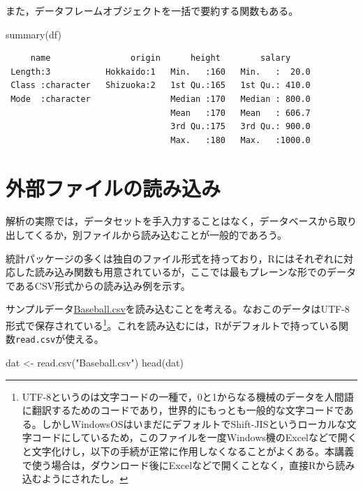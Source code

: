 \documentclass[
  a4paper,
]{ltjsbook}
\newenvironment{Shaded}{\begin{snugshade}}{\end{snugshade}}
\newcommand{\FunctionTok}[1]{\textcolor[rgb]{0.28,0.35,0.67}{#1}}
\newcommand{\NormalTok}[1]{\textcolor[rgb]{0.00,0.23,0.31}{#1}}
\newcommand{\OtherTok}[1]{\textcolor[rgb]{0.00,0.23,0.31}{#1}}
\newcommand{\StringTok}[1]{\textcolor[rgb]{0.13,0.47,0.30}{#1}}
\begin{document}
また，データフレームオブジェクトを一括で要約する関数もある。

\begin{Shaded}
\begin{Highlighting}[]
\FunctionTok{summary}\NormalTok{(df)}
\end{Highlighting}
\end{Shaded}

\begin{verbatim}
     name                origin      height        salary      
 Length:3           Hokkaido:1   Min.   :160   Min.   :  20.0  
 Class :character   Shizuoka:2   1st Qu.:165   1st Qu.: 410.0  
 Mode  :character                Median :170   Median : 800.0  
                                 Mean   :170   Mean   : 606.7  
                                 3rd Qu.:175   3rd Qu.: 900.0  
                                 Max.   :180   Max.   :1000.0  
\end{verbatim}

\section{外部ファイルの読み込み}\label{ux5916ux90e8ux30d5ux30a1ux30a4ux30ebux306eux8aadux307fux8fbcux307f}

解析の実際では，データセットを手入力することはなく，データベースから取り出してくるか，別ファイルから読み込むことが一般的であろう。

統計パッケージの多くは独自のファイル形式を持っており，Rにはそれぞれに対応した読み込み関数も用意されているが，ここでは最もプレーンな形でのデータであるCSV形式からの読み込み例を示す。

サンプルデータ\url{Baseball.csv}を読み込むことを考える。なおこのデータはUTF-8形式で保存されている\footnote{UTF-8というのは文字コードの一種で，0と1からなる機械のデータを人間語に翻訳するためのコードであり，世界的にもっとも一般的な文字コードである。しかしWindowsOSはいまだにデフォルトでShift-JISというローカルな文字コードにしているため，このファイルを一度Windows機のExcelなどで開くと文字化けし，以下の手続が正常に作用しなくなることがよくある。本講義で使う場合は，ダウンロード後にExcelなどで開くことなく，直接Rから読み込むようにされたし。}。これを読み込むには，Rがデフォルトで持っている関数\texttt{read.csv}が使える。

\begin{Shaded}
\begin{Highlighting}[]
\NormalTok{dat }\OtherTok{\textless{}{-}} \FunctionTok{read.csv}\NormalTok{(}\StringTok{"Baseball.csv"}\NormalTok{)}
\FunctionTok{head}\NormalTok{(dat)}
\end{Highlighting}
\end{Shaded}
\end{document}
